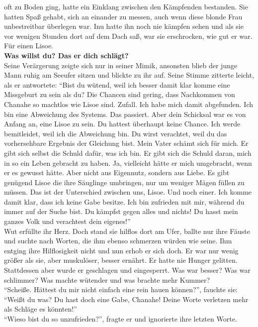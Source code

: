 oft zu Boden ging, hatte ein Einklang zwischen den Kämpfenden bestanden. Sie hatten Spaß gehabt, 
sich an einander zu messen, auch wenn diese blonde Frau unbestreitbar überlegen war. Inu hatte ihn 
noch nie kämpfen sehen und als sie vor wenigen Stunden dort auf dem Dach saß, war sie erschrocken, 
wie gut er war. Für einen Lisoe. \\
\textbf{Was willst du? Das er dich schlägt?}\\
Seine Verärgerung zeigte sich nur in seiner Mimik, ansonsten blieb der junge Mann ruhig am Seeufer 
sitzen und blickte zu ihr auf. Seine Stimme zitterte leicht, als er antwortete: ``Bist du wütend, 
weil ich besser damit klar komme eine Missgeburt zu sein als du? Die Chancen sind gering, dass 
Nachkommen von Chanahe so machtlos wie Lisoe sind. Zufall. Ich habe mich damit abgefunden. Ich bin 
eine Abweichung des Systems. Das passiert. Aber dein Schicksal war es von Anfang an, eine Lisoe zu 
sein. Du hattest überhaupt keine Chance. Ich werde bemitleidet, weil ich die Abweichung bin. Du 
wirst verachtet, weil du das vorhersehbare Ergebnis der Gleichung bist. Mein Vater schämt sich für 
mich. Er gibt sich selbst die Schuld dafür, was ich bin. Er gibt sich die Schuld daran, mich in so 
ein Leben gebracht zu haben. Ja, vielleicht hätte er mich umgebracht, wenn er es gewusst hätte. 
Aber nicht aus Eigennutz, sondern aus Liebe. Es gibt genügend Lisoe die ihre Säuglinge umbringen, 
nur um weniger Mägen füllen zu müssen. Das ist der Unterschied zwischen uns, Lisoe. Und noch einer. 
Ich komme damit klar, dass ich keine Gabe besitze. Ich bin zufrieden mit mir, während du immer auf 
der Suche bist. Du kämpfst gegen alles und nichts! Du hasst mein ganzes Volk und verachtest dein 
eigenes!''\\
Wut erfüllte ihr Herz. Doch stand sie hilflos dort am Ufer, ballte nur ihre Fäuste und suchte nach 
Worten, die ihm ebenso schmerzen würden wie seine. Ihm entging ihre Hilflosigkeit nicht und nun 
erhob er sich doch. Er war nur wenig größer als sie, aber muskulöser, besser ernährt. Er hatte nie 
Hunger gelitten. Stattdessen aber wurde er geschlagen und eingesperrt. Was war besser? Was war 
schlimmer? Was machte wütender und was brachte mehr Kummer?\\
``Scheiße. Hättest du mir nicht einfach eine rein hauen können?'', fauchte sie: ``Weißt du was? Du 
hast doch eine Gabe, Chanahe! Deine Worte verletzen mehr als Schläge es könnten!''\\
``Wieso bist du so unzufrieden?'', fragte er und ignorierte ihre letzten Worte.\\
